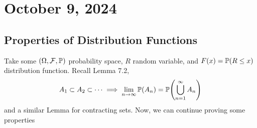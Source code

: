 \section{October 9, 2024}

\subsection{Properties of Distribution Functions}
Take some $(\Omega, \mathcal{F}, \mathbb{P})$ probability space, $R$ random variable, and $F(x) = \mathbb{P}(R \le x)$ distribution function. Recall Lemma 7.2,
\begin{align}
    A_1 \subset A_2 \subset \cdots \implies \lim_{n \to \infty} \mathbb{P}(A_n) = \mathbb{P}\qty(\bigcup_{n=1}^\infty A_n)
\end{align}
and a similar Lemma for contracting sets. Now, we can continue proving some properties
